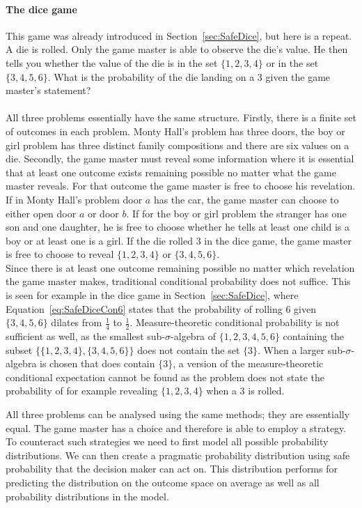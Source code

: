 \documentclass[a4paper]{report}
\theoremstyle{plain}
\theoremstyle{definition}
\theoremstyle{remark}
\numberwithin{equation}{chapter}
\DeclareMathOperator{\1}{\mathbbm{1}}
\begin{document}
\paragraph{The dice game}
This game was already introduced in Section~\ref{sec:SafeDice}, but here is a repeat. A die is rolled. Only the game master is able to observe the die's value. He then tells you whether the value of the die is in the set $\{1,2,3,4\}$ or in the set $\{3,4,5,6\}$. What is the probability of the die landing on a $3$ given the game master's statement?

\paragraph{}
All three problems essentially have the same structure. Firstly, there is a finite set of outcomes in each problem. Monty Hall's problem has three doors, the boy or girl problem has three distinct family compositions and there are six values on a die. Secondly, the game master must reveal some information where it is essential that at least one outcome exists remaining possible no matter what the game master reveals. For that outcome the game master is free to choose his revelation. If in Monty Hall's problem door $a$ has the car, the game master can choose to either open door $a$ or door $b$. If for the boy or girl problem the stranger has one son and one daughter, he is free to choose whether he tells at least one child is a boy or at least one is a girl. If the die rolled 3 in the dice game, the game master is free to choose to reveal $\{1,2,3,4\}$ or $\{3,4,5,6\}$.\\
Since there is at least one outcome remaining possible no matter which revelation the game master makes, traditional conditional probability does not suffice. This is seen for example in the dice game in Section~\ref{sec:SafeDice}, where Equation~\ref{eq:SafeDiceCon6} states that the probability of rolling $6$ given $\{3,4,5,6\}$ dilates from $\frac{1}{4}$ to $\frac{1}{2}$. Measure-theoretic conditional probability is not sufficient as well, as the smallest sub-$\sigma$-algebra of $\{1,2,3,4,5,6\}$ containing the subset $\{\{1,2,3,4\},\{3,4,5,6\}\}$ does not contain the set $\{3\}$. When a larger sub-$\sigma$-algebra is chosen that does contain $\{3\}$, a version of the measure-theoretic conditional expectation cannot be found as the problem does not state the probability of for example revealing $\{1,2,3,4\}$ when a $3$ is rolled.

All three problems can be analysed using the same methods; they are essentially equal. The game master has a choice and therefore is able to employ a strategy. To counteract such strategies we need to first model all possible probability distributions. We can then create a pragmatic probability distribution using safe probability that the decision maker can act on. This distribution performs for predicting the distribution on the outcome space on average as well as all probability distributions in the model.
\end{document}
